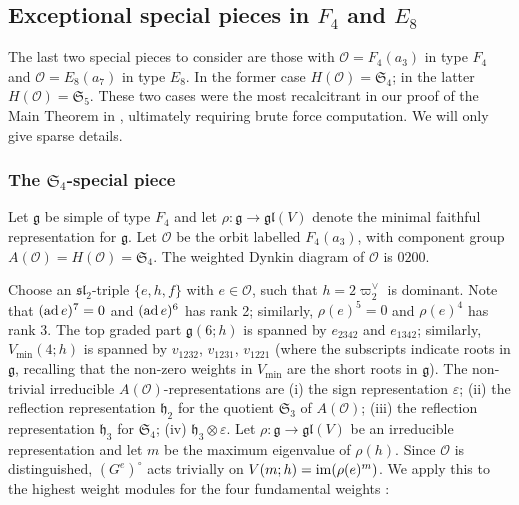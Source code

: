 \documentclass{amsart}
\theoremstyle{definition}
\def\mini{\mathrm{min}}
\newcommand{\g}{\mathfrak{g}}
\newcommand{\0}{\mathcal{O}}
\begin{document}
\subsection{Exceptional special pieces in $F_4$ and $E_8$}\label{exceptionalsubsec}

The last two special pieces to consider are those with $\0=F_4(a_3)$ in type $F_4$ and $\0=E_8(a_7)$ in type $E_8$.
In the former case $H(\0)=\mathfrak{S}_4$; in the latter $H(\0)=\mathfrak{S}_5$.
These two cases were the most recalcitrant in our proof of the Main Theorem in \cite{FJLS23}, ultimately requiring brute force computation.
We will only give sparse details.




\subsubsection{The $\mathfrak{S}_4$-special piece}

Let $\g$ be simple of type $F_4$ and let $\rho:\g\rightarrow\mathfrak{gl}(V)$ denote the minimal faithful representation for $\g$.
Let $\0$ be the orbit labelled $F_4(a_3)$, with component group $A(\0)=H(\0)=\mathfrak{S}_4$.
The weighted Dynkin diagram of $\0$ is $0200$.

Choose an $\mathfrak{sl}_2$-triple $\{ e,h,f\}$ with $e\in\0$, such that $h=2\varpi_2^\vee$ is dominant.
Note that $({\rm ad}\, e)^7=0$ and $({\rm ad}\, e)^6$ has rank 2; similarly, $\rho(e)^5=0$ and $\rho(e)^4$ has rank 3.
The top graded part $\g(6;h)$ is spanned by $e_{2342}$ and $e_{1342}$; similarly, $V_\mini(4;h)$ is spanned by $v_{1232}$, $v_{1231}$, $v_{1221}$ (where the subscripts indicate roots in $\g$, recalling that the non-zero weights in $V_\mini$ are the short roots in $\g$).
The non-trivial irreducible $A(\0)$-representations are (i) the sign representation $\varepsilon$; (ii) the reflection representation ${\mathfrak h}_2$ for the quotient $\mathfrak{S}_3$ of $A(\0)$; (iii) the reflection representation ${\mathfrak h}_3$ for $\mathfrak{S}_4$; (iv) ${\mathfrak h}_3\otimes\varepsilon$.
Let $\rho:\g\rightarrow\mathfrak{gl}(V)$ be an irreducible representation and let $m$ be the maximum eigenvalue of $\rho(h)$.
Since $\0$ is distinguished, $(G^e)^\circ$ acts trivially on $V(m;h)={\rm im}(\rho(e)^m)$.
We apply this to the highest weight modules for the four fundamental weights \cite[\S 2.2]{Sommers:Localsystems}:
\end{document}
